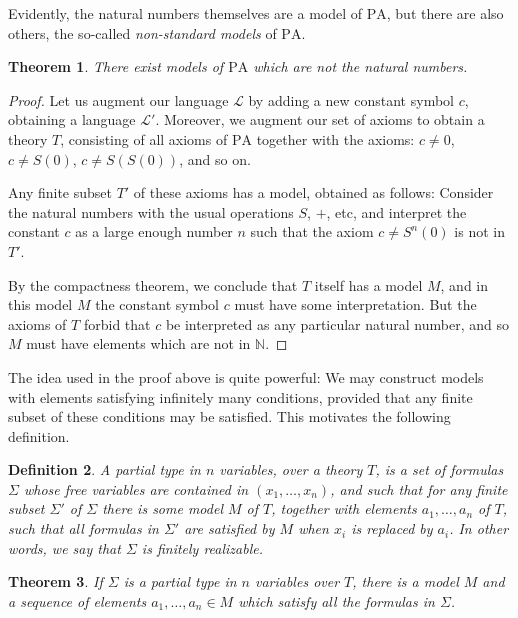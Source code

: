 \documentclass{article}
\newtheorem{theorem}{Theorem}[section]
\newtheorem{definition}[theorem]{Definition}
\theoremstyle{nonumberplain}
\newtheorem{proof}{Proof}
\newcommand{\N}{\mathbb{N}}
\newcommand{\Lang}{\mathcal{L}}
\begin{document}
Evidently, the natural numbers themselves are a model of $\mathrm{PA}$, but there are also others, the so-called \emph{non-standard models} of $\mathrm{PA}$.

\begin{theorem}\label{thm:nonstd}
There exist models of $\mathrm{PA}$ which are not the natural numbers.
\end{theorem}

\begin{proof}
Let us augment our language $\Lang$ by adding a new constant symbol $c$, obtaining a language $\Lang'$. Moreover, we augment our set of axioms to obtain a theory $T$, consisting of all axioms of $\mathrm{PA}$ together with the axioms: $c \neq 0$, $c \neq S(0)$, $c \neq S(S(0))$, and so on.

Any finite subset $T'$ of these axioms has a model, obtained as follows: Consider the natural numbers with the usual operations $S$, $+$, etc, and interpret the constant $c$ as a large enough number $n$ such that the axiom $c \neq S^n(0)$ is not in $T'$.

By the compactness theorem, we conclude that $T$ itself has a model $M$, and in this model $M$ the constant symbol $c$ must have some interpretation. But the axioms of $T$ forbid that $c$ be interpreted as any particular natural number, and so $M$ must have elements which are not in $\N$.
\end{proof}

The idea used in the proof above is quite powerful: We may construct models with elements satisfying infinitely many conditions, provided that any finite subset of these conditions may be satisfied. This motivates the following definition.

\begin{definition}
A partial type in $n$ variables, over a theory $T$, is a set of formulas $\Sigma$ whose free variables are contained in $(x_1, \dots, x_n)$, and such that for any finite subset $\Sigma'$ of $\Sigma$ there is some model $M$ of $T$, together with elements $a_1, \dots, a_n$ of $T$, such that all formulas in $\Sigma'$ are satisfied by $M$ when $x_i$ is replaced by $a_i$. In other words, we say that $\Sigma$ is \emph{finitely realizable}.
\end{definition}

\begin{theorem}\label{thm:ptype}
If $\Sigma$ is a partial type in $n$ variables over $T$, there is a model $M$ and a sequence of elements $a_1, \dots, a_n \in M$ which satisfy all the formulas in $\Sigma$.
\end{theorem}
\end{document}
